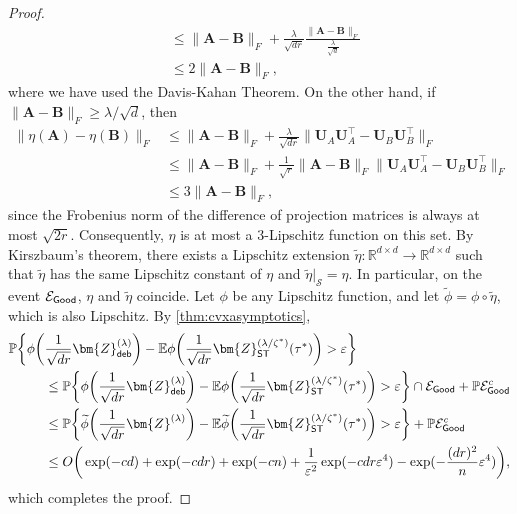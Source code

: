 \documentclass[10pt]{article}
\newcommand{\eps}{\ensuremath{\varepsilon}}
\newcommand{\s}{^*}
\renewcommand{\t}{^{\top}}
\newcommand{\p}{\mathbb{P}}
\renewcommand{\tilde}{\widetilde}
\theoremstyle{definition}
\begin{document}
\begin{proof}
\begin{align}
    &\leq \| \bm{A} - \bm{B}\|_F +\frac{\lambda}{\sqrt{dr}}\frac{\|\bm{A} - \bm{B}\|_F}{\frac{\lambda}{\sqrt{d}}} \\
    &\leq 2 \| \bm{A} - \bm{B}\|_F,
\end{align}
where we have used the Davis-Kahan Theorem.  On the other hand, if $\|\bm{A} - \bm{B}\|_F \geq \lambda/\sqrt{d}$, then
\begin{align}
     \| \eta (\bm{A} ) - \eta (\bm{B}) \|_F &\leq \| \bm{A} - \bm{B}\|_F + \frac{\lambda}{\sqrt{dr}} \| \bm{U}_A \bm{U}_A\t - \bm{U}_B \bm{U}_B\t \|_F \\
     &\leq \| \bm{A} - \bm{B}\|_F + \frac{1}{\sqrt{r}} \| \bm{A} - \bm{B}\|_F \| \bm{U}_A \bm{U}_A\t - \bm{U}_B \bm{U}_B\t \|_F \\
     &\leq 3 \| \bm{A} - \bm{B} \|_F,
\end{align}
since the Frobenius norm of the difference of projection matrices is always at most $\sqrt{2r}$.  Consequently, $\eta$ is at most a $3$-Lipschitz function on this set.  By Kirszbaum's theorem, there exists a Lipschitz extension $\tilde \eta : \mathbb{R}^{d\times d} \to \mathbb{R}^{d\times d}$ such that $\tilde \eta $ has the same Lipschitz constant of $\eta $ and $\tilde \eta |_{\mathcal{S}} = \eta$.  In particular, on the event $\mathcal{E}_{{\sf Good}}$, $\eta $ and $\tilde \eta$ coincide.  Let $\phi$ be any Lipschitz function, and let $\tilde \phi = \phi \circ \tilde \eta$, which is also Lipschitz.  By \cref{thm:cvxasymptotics},
\begin{align}
    \p\bigg\{  \phi \bigg( &\frac{1}{\sqrt{dr}} \bm{Z}^{(\lambda)}_{{\sf deb}} \bigg) - \mathbb{E} \phi \bigg( \frac{1}{\sqrt{dr}} \bm{Z}^{(\lambda/\zeta\s)}_{{\sf ST}}(\tau\s) \bigg) > \eps \bigg\} \\
    &\leq  \p\bigg\{  \phi \bigg( \frac{1}{\sqrt{dr}} \bm{Z}^{(\lambda)}_{{\sf deb}} \bigg) - \mathbb{E} \phi \bigg( \frac{1}{\sqrt{dr}} \bm{Z}^{(\lambda/\zeta\s)}_{{\sf ST}}(\tau\s) \bigg) > \eps \bigg\} \cap \mathcal{E}_{{\sf Good}} + \p \mathcal{E}_{{\sf Good}}^c \\
    &\leq \p\bigg\{ \tilde \phi \bigg( \frac{1}{\sqrt{dr}} \bm{Z}^{(\lambda)} \bigg) - \mathbb{E} \tilde \phi \bigg( \frac{1}{\sqrt{dr}} \bm{Z}^{(\lambda/\zeta\s)}_{{\sf ST}}(\tau\s) \bigg) > \eps \bigg\} + \p \mathcal{E}_{{\sf Good}}^c \\
    &\leq   O\bigg( \exp( - c d) +  \exp( - c dr) + \exp( - c n) + \frac{1}{\eps^2} \exp(-c dr \eps^4 ) - \exp( - \frac{(dr)^2}{n} \eps^4) \bigg),
\end{align}
which completes the proof.
\end{proof}
\end{document}

